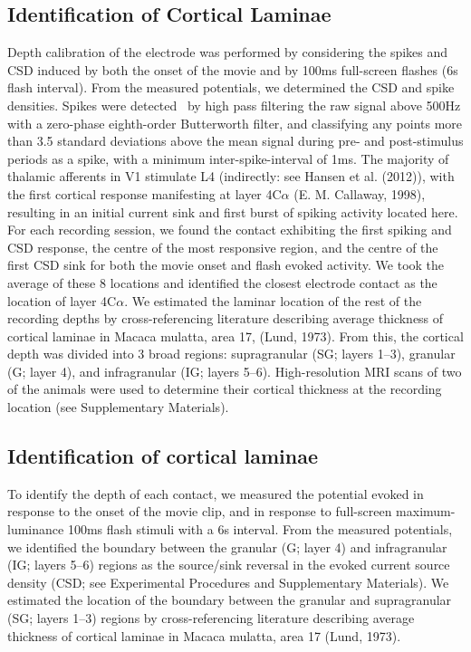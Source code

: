\subsection{Identification of Cortical Laminae}
Depth calibration of the electrode was performed by considering the spikes and \ac{CSD} induced by both the onset of the movie and by 100ms full-screen flashes (6s flash interval).
From the measured potentials, we determined the \ac{CSD} and spike densities.
Spikes were detected \ by high pass filtering the raw signal above 500Hz with a zero-phase eighth-order Butterworth filter, and classifying any points more than 3.5 standard deviations above the mean signal during pre- and post-stimulus periods as a spike, with a minimum inter-spike-interval of 1ms.
The majority of thalamic afferents in \ac{V1} stimulate \ac{L4} (indirectly: see Hansen et al. (2012)), with the first cortical response manifesting at layer 4C$\alpha$ (E. M. Callaway, 1998), resulting in an initial current sink and first burst of spiking activity located here.
For each recording session, we found the contact exhibiting the first spiking and \ac{CSD} response, the centre of the most responsive region, and the centre of the first \ac{CSD} sink for both the movie onset and flash evoked activity.
We took the average of these 8 locations and identified the closest electrode contact as the location of layer 4C$\alpha$.
We estimated the laminar location of the rest of the recording depths by cross-referencing literature describing average thickness of cortical laminae in Macaca mulatta, area 17, (Lund, 1973).
From this, the cortical depth was divided into 3 broad regions: supragranular (SG; layers 1--3), granular (G; layer 4), and infragranular (IG; layers 5--6).
High-resolution \ac{MRI} scans of two of the animals were used to determine their cortical thickness at the recording location (see Supplementary Materials).

\subsection{Identification of cortical laminae}
To identify the depth of each contact, we measured the potential evoked in response to the onset of the movie clip, and in response to full-screen maximum-luminance 100ms flash stimuli with a 6s interval.
From the measured potentials, we identified the boundary between the granular (G; layer 4) and infragranular (IG; layers 5--6) regions as the source/sink reversal in the evoked current source density (\ac{CSD}; see Experimental Procedures and Supplementary Materials).
We estimated the location of the boundary between the granular and supragranular (SG; layers 1--3) regions by cross-referencing literature describing average thickness of cortical laminae in Macaca mulatta, area 17 (Lund, 1973).

